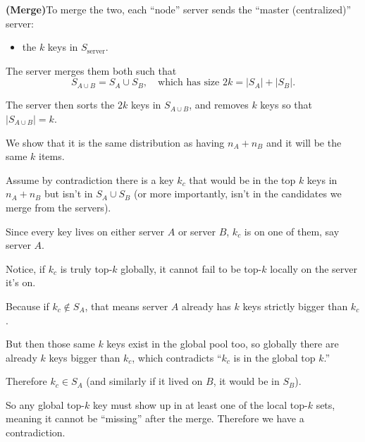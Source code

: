 \documentclass[11pt]{article}
\begin{document}
\begin{enumerate}[label=(\alph*)]
\textbf{(Merge)}\quad To merge the two, each ``node'' server sends the ``master (centralized)'' server:

\begin{itemize}
\item the $k$ keys in $S_{\text{server}}$.
\end{itemize}

The server merges them both such that
\[
S_{A\cup B}=S_A \cup S_B,
\quad \text{which has size } 2k = |S_A| + |S_B|.
\]

The server then sorts the $2k$ keys in $S_{A\cup B}$, and removes $k$ keys so that $|S_{A\cup B}|=k$.

We show that it is the same distribution as having $n_A+n_B$ and it will be the same $k$ items.

Assume by contradiction there is a key $k_c$ that would be in the top $k$ keys in $n_A + n_B$ but isn't in $S_A \cup S_B$ (or more importantly, isn't in the candidates we merge from the servers).

Since every key lives on either server $A$ or server $B$, $k_c$ is on one of them, say server $A$.

Notice, if $k_c$ is truly top-$k$ globally, it cannot fail to be top-$k$ locally on the server it's on.

Because if $k_c \notin S_A$, that means server $A$ already has $k$ keys strictly bigger than $k_c$.

But then those same $k$ keys exist in the global pool too, so globally there are already $k$ keys bigger than $k_c$,
which contradicts ``$k_c$ is in the global top $k$.''

Therefore $k_c \in S_A$ (and similarly if it lived on $B$, it would be in $S_B$).

So any global top-$k$ key must show up in at least one of the local top-$k$ sets,
meaning it cannot be ``missing'' after the merge. Therefore we have a contradiction.
\end{enumerate}
\end{document}

